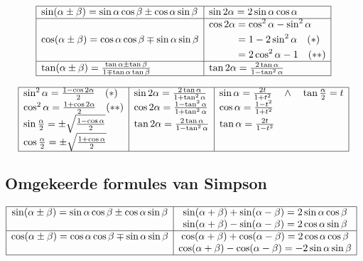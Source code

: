 \documentclass[a5paper]{article}
\begin{document}
\[
\begin{array}{|l|l|}
\hline
\sin(\alpha \pm \beta) = \sin\alpha \cos\beta \pm \cos\alpha \sin\beta & \sin 2\alpha = 2\sin\alpha \cos\alpha \\
\hline
\cos(\alpha \pm \beta) = \cos\alpha \cos\beta \mp \sin\alpha \sin\beta & 
\begin{aligned}
\cos 2\alpha &= \cos^2\alpha - \sin^2\alpha \\
&= 1 - 2\sin^2\alpha \quad (*) \\
&= 2\cos^2\alpha - 1 \quad (**)
\end{aligned} \\
\hline
\tan(\alpha \pm \beta) = \frac{\tan\alpha \pm \tan\beta}{1 \mp \tan\alpha \tan\beta} & 
\tan 2\alpha = \frac{2\tan\alpha}{1 - \tan^2\alpha} \\
\hline
\end{array}
\]

\[
\begin{array}{|l|l|l|}
\hline
\sin^2\alpha = \frac{1 - \cos 2\alpha}{2} \quad (*) & \sin 2\alpha = \frac{2\tan\alpha}{1 + \tan^2\alpha} & 
\sin\alpha = \frac{2t}{1 + t^2} \quad \land \quad \tan\frac{\alpha}{2} = t \\
\cos^2\alpha = \frac{1 + \cos 2\alpha}{2} \quad (**) & \cos 2\alpha = \frac{1 - \tan^2\alpha}{1 + \tan^2\alpha} & 
\cos\alpha = \frac{1 - t^2}{1 + t^2} \\
\sin\frac{\alpha}{2} = \pm\sqrt{\frac{1 - \cos\alpha}{2}} & \tan 2\alpha = \frac{2\tan\alpha}{1 - \tan^2\alpha} & 
\tan\alpha = \frac{2t}{1 - t^2} \\
\cos\frac{\alpha}{2} = \pm\sqrt{\frac{1 + \cos\alpha}{2}} & & \\
\hline
\end{array}
\]

\subsection{Omgekeerde formules van Simpson}
$
\begin{array}{|c|c|}
\hline
\sin(\alpha \pm \beta) = \sin\alpha\cos\beta \pm \cos\alpha\sin\beta & 
\sin(\alpha + \beta) + \sin(\alpha - \beta) = 2\sin\alpha\cos\beta \\
& 
\sin(\alpha + \beta) - \sin(\alpha - \beta) = 2\cos\alpha\sin\beta \\
\hline
\cos(\alpha \pm \beta) = \cos\alpha\cos\beta \mp \sin\alpha\sin\beta & 
\cos(\alpha + \beta) + \cos(\alpha - \beta) = 2\cos\alpha\cos\beta \\
& 
\cos(\alpha + \beta) - \cos(\alpha - \beta) = -2\sin\alpha\sin\beta \\
\hline
\end{array}
$
\end{document}
